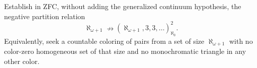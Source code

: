Establish in ZFC, without adding the generalized continuum hypothesis, the negative partition relation
\[
\aleph_{\omega+1}\nrightarrow(\aleph_{\omega+1},3,3,\ldots)_{\aleph_0}^{2}.
\]
Equivalently, seek a countable coloring of pairs from a set of size $\aleph_{\omega+1}$ with no color-zero homogeneous set of that size and no monochromatic triangle in any other color.
